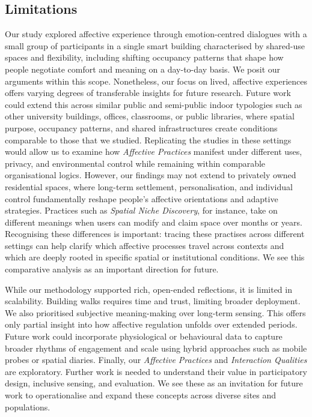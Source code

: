\subsection{Limitations}
\label{subsec:ch3-limitations}
Our study explored affective experience through emotion-centred dialogues with a small group of participants in a single smart building characterised by shared-use spaces and flexibility, including shifting occupancy patterns that shape how people negotiate comfort and meaning on a day-to-day basis. We posit our arguments within this scope. Nonetheless, our focus on lived, affective experiences offers varying degrees of transferable insights for future research. Future work could extend this across similar public and semi-public indoor typologies such as other university buildings, offices, classrooms, or public libraries, where spatial purpose, occupancy patterns, and shared infrastructures create conditions comparable to those that we studied. Replicating the studies in these settings would allow us to examine how \textit{Affective Practices} manifest under different uses, privacy, and environmental control while remaining within comparable organisational logics. However, our findings may not extend to privately owned residential spaces, where long-term settlement, personalisation, and individual control fundamentally reshape people’s affective orientations and adaptive strategies. Practices such as \textit{Spatial Niche Discovery}, for instance, take on different meanings when users can modify and claim space over months or years. Recognising these differences is important: tracing these practises across different settings can help clarify which affective processes travel across contexts and which are deeply rooted in specific spatial or institutional conditions. We see this comparative analysis as an important direction for future.

While our methodology supported rich, open-ended reflections, it is limited in scalability. Building walks requires time and trust, limiting broader deployment. We also prioritised subjective meaning-making over long-term sensing. This offers only partial insight into how affective regulation unfolds over extended periods. Future work could incorporate physiological or behavioural data to capture broader rhythms of engagement and scale using hybrid approaches such as mobile probes or spatial diaries. Finally, our \textit{Affective Practices} and \textit{Interaction Qualities} are exploratory. Further work is needed to understand their value in participatory design, inclusive sensing, and evaluation. We see these as an invitation for future work to operationalise and expand these concepts across diverse sites and populations.
